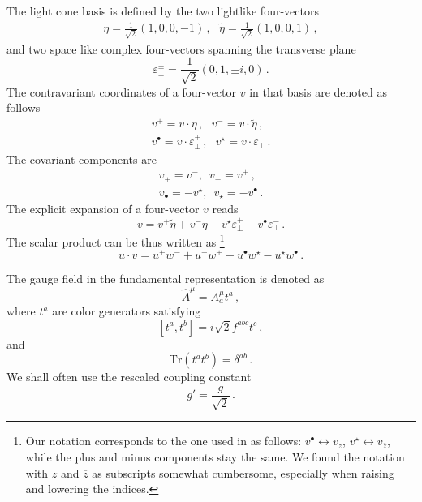 \documentclass[english,american]{article}
\begin{document}
The light cone basis is defined by the two lightlike four-vectors
\begin{gather}
\eta=\frac{1}{\sqrt{2}}\left(1,0,0,-1\right)\,,\,\,\,\,\tilde{\eta}=\frac{1}{\sqrt{2}}\left(1,0,0,1\right)\, ,\label{eq:etavec}
\end{gather}
and two space like complex four-vectors spanning the transverse plane
\begin{equation}
\varepsilon_{\perp}^{\pm}=\frac{1}{\sqrt{2}}\left(0,1,\pm i,0\right)\,.\label{eq:epsPlMin}
\end{equation}
The contravariant coordinates of a four-vector $v$ in that basis
are denoted as follows
\begin{gather}
v^{+}=v\cdot\eta\,,\,\,\,\, v^{-}=v\cdot\tilde{\eta}\,,\label{eq:plusmindef}\\
v^{\bullet}=v\cdot\varepsilon_{\bot}^{+}\,,\,\,\,\, v^{\star}=v\cdot\varepsilon_{\bot}^{-}\,.\label{eq:zzbardef}
\end{gather}
The covariant components are
\begin{gather}
v_{+}=v^{-},\,\,\, v_{-}=v^{+}\,,\\
v_{\bullet}=-v^{\star},\,\,\, v_{\star}=-v^{\bullet}\,.
\end{gather}
The explicit expansion of a four-vector $v$ reads
\begin{equation}
v=v^{+}\tilde{\eta}+v^{-}\eta-v^{\star}\varepsilon_{\perp}^{+}-v^{\bullet}\varepsilon_{\perp}^{-}\,.
\end{equation}
The scalar product can be thus written as%
\footnote{Our notation corresponds to the one used in \citep{Mansfield2006}
as follows: $v^{\bullet}\leftrightarrow v_{z}$, $v^{\star}\leftrightarrow v_{\overline{z}}$, while the plus and minus components stay the same. We found the notation
with $z$ and $\overline{z}$ as subscripts somewhat cumbersome, especially when
raising and lowering the indices. %
}
\begin{equation}
u\cdot v=u^{+}w^{-}+u^{-}w^{+}-u^{\bullet}w^{\star}-u^{\star}w^{\bullet}\,.\label{eq:scalarprod}
\end{equation}


The gauge field in the fundamental representation is denoted as 
\begin{equation}
\hat{A}^{\mu}=A_{a}^{\mu}t^{a}\,,
\end{equation}
where $t^{a}$ are color generators satisfying 
\begin{equation}
\left[t^{a},t^{b}\right]=i\sqrt{2}f^{abc}t^{c}\,,
\end{equation}
and 
\begin{equation}
\mathrm{Tr}\left(t^{a}t^{b}\right)=\delta^{ab}\,.
\end{equation}
We shall often use the rescaled coupling constant
\begin{equation}
g'=\frac{g}{\sqrt{2}}\,.
\end{equation}
\end{document}
